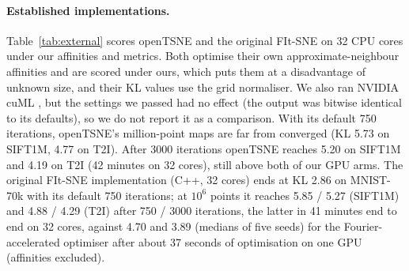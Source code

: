 \documentclass[11pt]{article}
\begin{document}
\paragraph{Established implementations.} Table~\ref{tab:external} scores openTSNE \citep{policar2024opentsne} and
the original FIt-SNE on 32 CPU cores under our affinities and metrics. Both optimise their own approximate-neighbour
affinities and are scored under ours, which puts them at a disadvantage of unknown size, and their KL values use the
grid normaliser. We also ran NVIDIA cuML \citep{cuml}, but the settings we passed had no effect (the output was
bitwise identical to its defaults), so we do not report it as a comparison. With its default 750 iterations, openTSNE's
million-point maps are far from converged (KL 5.73 on SIFT1M, 4.77 on T2I). After 3000 iterations openTSNE
reaches 5.20 on SIFT1M and 4.19 on T2I (42 minutes on 32 cores), still above both of our GPU arms. The
original FIt-SNE implementation (C++, 32 cores) ends at KL 2.86 on MNIST-70k with its default 750 iterations; at
$10^6$ points it reaches 5.85 / 5.27 (SIFT1M) and 4.88 / 4.29 (T2I) after 750 / 3000 iterations, the latter in 41
minutes end to end on 32 cores, against 4.70 and 3.89 (medians of five seeds) for the Fourier-accelerated optimiser
after about 37 seconds of optimisation on one GPU (affinities excluded).
\begin{table}[t]\centering\small\resizebox{\linewidth}{!}{}
\caption{Established implementations under our affinities and metrics. External embeddings are scored with the
grid normaliser, whose error in our own runs was at most 0.04 in KL (0.06 for two unstable \emph{tuned} runs), well
below the gaps in this table; our rows use exact KL and repeat Table~\ref{tab:main}. $^\ast$Timing contaminated by a concurrent CPU job; not used. $^\ddagger$Optimisation only: our affinities use an exact GPU $k$-NN search (25--90\,s at $10^6$
points) that an approximate search would shorten.}\label{tab:external}\end{table}
\end{document}
